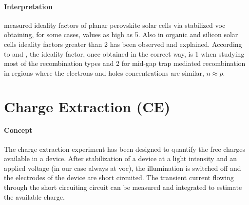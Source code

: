 		\paragraph{Interpretation} %
		 measured ideality factors of planar perovskite solar cells via stabilized \gls{voc} obtaining, for some cases, values as high as 5. Also in organic \cite{Kirchartz2011,Kirchartz2012} and silicon solar cells \cite{Breitenstein2006} ideality factors greater than 2 has been observed and explained. According to  and , the ideality factor, once obtained in the correct way, is 1 when studying most of the recombination types and 2 for mid-gap trap mediated recombination in regions where the electrons and holes concentrations are similar, $n \approx p$.

\section{Charge Extraction (CE)}

	\paragraph{Concept} The charge extraction experiment has been designed\cite{Duffy2000} to quantify the free charges available in a device. After stabilization of a device at a light intensity and an applied voltage (in our case always at \gls{voc}), the illumination is switched off and the electrodes of the device are short circuited. The transient current flowing through the short circuiting circuit can be measured and integrated to estimate the available charge.
	
	
